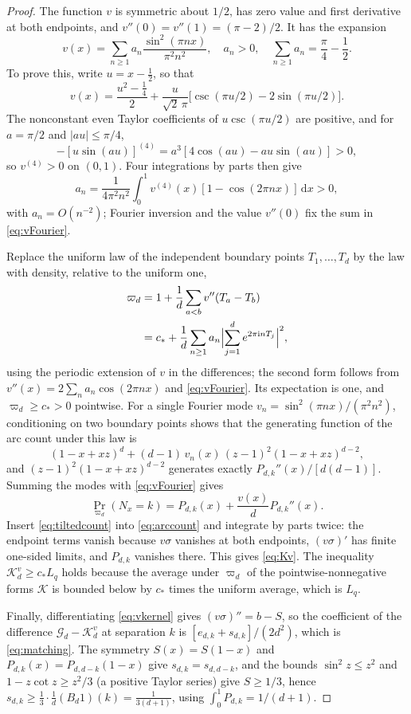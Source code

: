 \documentclass[aps,prl,reprint,superscriptaddress,longbibliography,floatfix,raggedbottom]{revtex4-2}
\newcommand{\ii}{\mathrm i}
\newcommand{\dd}{\,\mathrm d}
\newcommand{\abs}[1]{\lvert #1\rvert}
\DeclareMathOperator{\Prob}{Pr}
\newcommand{\cstar}{c_*}
\newcommand{\Gd}{\mathcal G_d}
\begin{document}
\begin{proof}
The function $v$ is symmetric about $1/2$, has zero value and first
derivative at both endpoints, and $v''(0)=v''(1)=(\pi-2)/2$. It has the
expansion
\begin{equation}\label{eq:vFourier}
v(x)=\sum_{n\ge1}a_n\frac{\sin^2(\pi nx)}{\pi^2n^2},
\quad a_n>0,\quad
\sum_{n\ge1}a_n=\frac\pi4-\frac12 .
\end{equation}
To prove this, write $u=x-\tfrac12$, so that
\[
v(x)=\frac{u^2-\tfrac14}2
+\frac u{\sqrt2\,\pi}
\bigl[\csc(\pi u/2)-2\sin(\pi u/2)\bigr].
\]
The nonconstant even Taylor coefficients of $u\csc(\pi u/2)$ are
positive, and for $a=\pi/2$ and $\abs{au}\le\pi/4$,
\[
-[u\sin(au)]^{(4)}=a^3[4\cos(au)-au\sin(au)]>0 ,
\]
so $v^{(4)}>0$ on $(0,1)$. Four integrations by parts then give
\[
a_n=\frac1{4\pi^2n^2}\int_0^1v^{(4)}(x)[1-\cos(2\pi nx)]\dd x>0,
\]
with $a_n=O(n^{-2})$; Fourier inversion and the value $v''(0)$ fix the
sum in \eqref{eq:vFourier}.

Replace the uniform law of the independent boundary points
$T_1,\dots,T_d$ by the law with density, relative to the uniform one,
\begin{equation}\label{eq:partitiondensity}
\begin{split}
\varpi_d&=1+\frac1d\sum_{a<b}v''(T_a-T_b)\\
&=\cstar+\frac1d\sum_{n\ge1}a_n
\Bigl|\sum_{j=1}^de^{2\pi\ii nT_j}\Bigr|^2,
\end{split}
\end{equation}
using the periodic extension of $v$ in the differences; the second form
follows from $v''(x)=2\sum_na_n\cos(2\pi nx)$ and
\eqref{eq:vFourier}. Its expectation is one, and
$\varpi_d\ge\cstar>0$ pointwise. For a single Fourier mode
$v_n=\sin^2(\pi nx)/(\pi^2n^2)$, conditioning on two boundary points
shows that the generating function of the arc count under this law is
\[
(1-x+xz)^d+(d-1)\,v_n(x)\,(z-1)^2(1-x+xz)^{d-2},
\]
and $(z-1)^2(1-x+xz)^{d-2}$ generates exactly
$P_{d,k}''(x)/[d(d-1)]$. Summing the modes with \eqref{eq:vFourier}
gives
\begin{equation}\label{eq:tiltedcount}
\Prob_{\varpi_d}(N_x=k)=P_{d,k}(x)+\frac{v(x)}dP_{d,k}''(x).
\end{equation}
Insert \eqref{eq:tiltedcount} into \eqref{eq:arccount} and integrate by
parts twice: the endpoint terms vanish because $v\sigma$ vanishes at both
endpoints, $(v\sigma)'$ has finite one-sided limits, and $P_{d,k}$
vanishes
there. This gives \eqref{eq:Kv}. The
inequality $\mathcal K_d^v\ge\cstar L_q$ holds because the average under $\varpi_d$
of the pointwise-nonnegative forms $\mathcal K$ is bounded below by $\cstar$
times the uniform average, which is $L_q$.

Finally, differentiating \eqref{eq:vkernel} gives $(v\sigma)''=b-S$,
so the
coefficient of the difference $\Gd-\mathcal K_d^v$ at separation $k$ is
$[e_{d,k}+s_{d,k}]/(2d^2)$, which is \eqref{eq:matching}. The symmetry
$S(x)=S(1-x)$ and $P_{d,k}(x)=P_{d,d-k}(1-x)$ give
$s_{d,k}=s_{d,d-k}$, and the bounds $\sin^2z\le z^2$ and
$1-z\cot z\ge z^2/3$ (a positive Taylor series) give $S\ge1/3$, hence
$s_{d,k}\ge\tfrac13\cdot\tfrac1{d}(B_d1)(k)=\tfrac1{3(d+1)}$, using
$\int_0^1P_{d,k}=1/(d+1)$.
\end{proof}
\end{document}
